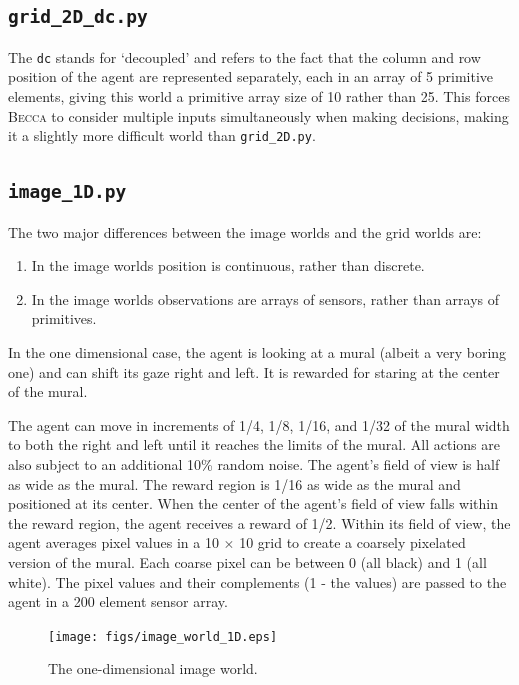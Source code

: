 \subsection{\texttt{grid\_2D\_dc.py}}

The \texttt{dc} stands for `decoupled' and refers to the fact that the column and row position of the agent are represented separately, each in an array of 5 primitive elements, giving this world a primitive array size of 10 rather than 25. This forces \textsc{Becca} to consider multiple inputs simultaneously when making decisions, making it a slightly more difficult world than \texttt{grid\_2D.py}.

\subsection{\texttt{image\_1D.py}}

The two major differences between the image worlds and the grid worlds are:

\begin{enumerate}
\item In the image worlds position is continuous, rather than discrete.
\item In the image worlds observations are arrays of sensors, rather than arrays of primitives.
\end{enumerate}

In the one dimensional case, the agent is looking at a mural (albeit a very boring one) and can shift its gaze right and left. It is rewarded for staring at the center of the mural.

The agent can move in increments of 1/4, 1/8, 1/16, and 1/32 of the mural width to both the right and left until it reaches the limits of the mural. All actions are also subject to an additional 10\% random noise. The agent's field of view is half as wide as the mural. The reward region is 1/16 as wide as the mural and positioned at its center. When the center of the agent's field of view falls within the reward region, the agent receives a reward of 1/2. Within its field of view, the agent averages pixel values in a 10 $\times$ 10 grid to create a coarsely pixelated version of the mural. Each coarse pixel can be between 0 (all black) and 1 (all white). The pixel values and their complements (1 - the values) are passed to the agent in a 200 element sensor array.

\begin{figure}
\centering
\texttt{[image: figs/image\_world\_1D.eps]}
\caption{The one-dimensional image world.}
\label{image_1D}
\end{figure}

